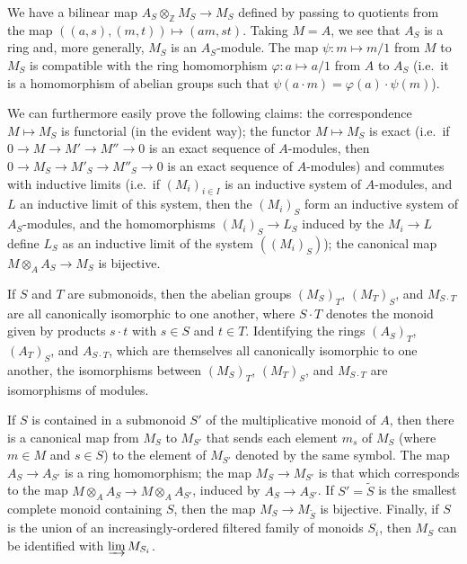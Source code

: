 \documentclass[british]{article}
\newcommand{\oldpage}[1]{\marginpar{\footnotesize$\Big\vert$ \textit{p.~#1}}}
\begin{document}
We have a bilinear map \(A_S\otimes_\mathbb{Z}M_S\to M_S\) defined by
passing to quotients from the map \(((a,s),(m,t))\mapsto(am,st)\).
Taking \(M=A\), we see that \(A_S\) is a ring and, more generally,
\(M_S\) is an \(A_S\)-module. The map \(\psi\colon m\mapsto m/1\) from
\(M\) to \(M_S\) is compatible with the ring homomorphism
\(\varphi\colon a\mapsto a/1\) from \(A\) to \(A_S\) (i.e.~it is a
homomorphism of abelian groups such that
\(\psi(a\cdot m)=\varphi(a)\cdot\psi(m)\)).

We can furthermore easily prove the following claims: the correspondence
\(M\mapsto M_S\) is functorial (in the evident way); the functor
\(M\mapsto M_S\) is exact (i.e.~if \(0\to M\to M'\to M''\to 0\) is an
exact sequence of \(A\)-modules, then \(0\to M_S\to M'_S\to M''_S\to 0\)
is an exact sequence of \(A\)-modules) and commutes with inductive
limits (i.e.~if \((M_i)_{i\in I}\) is an inductive system of
\(A\)-modules, and \(L\) an inductive limit of this system, then the
\((M_i)_S\) form an inductive system of \(A_S\)-modules, and the
homomorphisms \((M_i)_S\to L_S\) induced by the \(M_i\to L\) define
\(L_S\) as an inductive limit of the system \(((M_i)_S)\)); the
canonical map \(M\otimes_A A_S\to M_S\) is bijective.

If \(S\) and \(T\) are submonoids, then the abelian groups \((M_S)_T\),
\((M_T)_S\), and \(M_{S\cdot T}\) are all canonically isomorphic to one
another, where \(S\cdot T\) denotes the monoid given by products
\(s\cdot t\) with \(s\in S\) and \(t\in T\). Identifying the rings
\((A_S)_T\), \((A_T)_S\), and \(A_{S\cdot T}\), which are themselves all
canonically isomorphic to one another, the isomorphisms between
\((M_S)_T\), \((M_T)_S\), and \(M_{S\cdot T}\) are isomorphisms of
modules.

\oldpage{1-03}

If \(S\) is contained in a submonoid \(S'\) of the multiplicative monoid
of \(A\), then there is a canonical map from \(M_S\) to \(M_{S'}\) that
sends each element \(m_s\) of \(M_S\) (where \(m\in M\) and \(s\in S\))
to the element of \(M_{S'}\) denoted by the same symbol. The map
\(A_S\to A_{S'}\) is a ring homomorphism; the map \(M_S\to M_{S'}\) is
that which corresponds to the map
\(M\otimes_A A_S\to M\otimes_A A_{S'}\), induced by \(A_S\to A_{S'}\).
If \(S'=\widetilde{S}\) is the smallest complete monoid containing
\(S\), then the map \(M_S\to M_{\widetilde{S}}\) is bijective. Finally,
if \(S\) is the union of an increasingly-ordered filtered family of
monoids \(S_i\), then \(M_S\) can be identified with
\(\varinjlim M_{S_i}\).
\end{document}
